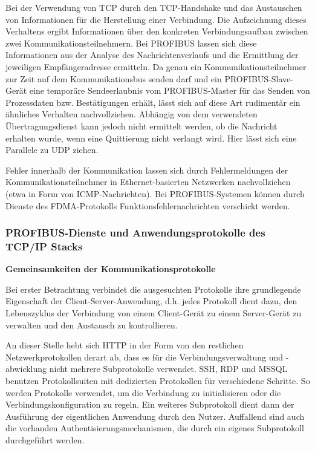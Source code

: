 Bei der Verwendung von TCP durch den TCP-Handshake und das Austauschen von Informationen für die Herstellung einer Verbindung. Die Aufzeichnung dieses Verhaltens ergibt Informationen über den konkreten Verbindungsaufbau zwischen zwei Kommunikationsteilnehmern. Bei PROFIBUS lassen sich diese Informationen aus der Analyse des Nachrichtenverlaufs und die Ermittlung der jeweiligen Empfängeradresse ermitteln. Da genau ein Kommunikationsteilnehmer zur Zeit auf dem Kommunikationsbus senden darf und ein PROFIBUS-Slave-Gerät eine temporäre Sendeerlaubnis vom PROFIBUS-Master für das Senden von Prozessdaten bzw. Bestätigungen erhält, lässt sich auf diese Art rudimentär ein ähnliches Verhalten nachvollziehen. Abhängig von dem verwendeten Übertragungsdienst kann jedoch nicht ermittelt werden, ob die Nachricht erhalten wurde, wenn eine Quittierung nicht verlangt wird. Hier lässt sich eine Parallele zu UDP ziehen.

Fehler innerhalb der Kommunikation lassen sich durch Fehlermeldungen der Kommunikationsteilnehmer in Ethernet-basierten Netzwerken nachvollziehen (etwa in Form von ICMP-Nachrichten). Bei PROFIBUS-Systemen können durch Dienste des FDMA-Protokolls Funktionsfehlernachrichten verschickt werden. \\


\subsubsection{PROFIBUS-Dienste und Anwendungsprotokolle des TCP/IP Stacks}
\textbf{Gemeinsamkeiten der Kommunikationsprotokolle}

Bei erster Betrachtung verbindet die ausgesuchten Protokolle ihre grundlegende Eigenschaft der Client-Server-Anwendung, d.h. jedes Protokoll dient dazu, den Lebenszyklus der Verbindung von einem Client-Gerät zu einem Server-Gerät zu verwalten und den Austausch zu kontrollieren. 

An dieser Stelle hebt sich HTTP in der Form von den restlichen Netzwerkprotokollen derart ab, dass es für die Verbindungsverwaltung und -abwicklung nicht mehrere Subprotokolle verwendet. SSH, RDP und MSSQL benutzen Protokollsuiten mit dedizierten Protokollen für verschiedene Schritte. So werden Protokolle verwendet, um die Verbindung zu initialisieren oder die Verbindungskonfiguration zu regeln. Ein weiteres Subprotokoll dient dann der Ausführung der eigentlichen Anwendung durch den Nutzer. Auffallend sind auch die vorhanden Authentisierungsmechanismen, die durch ein eigenes Subprotokoll durchgeführt werden.

